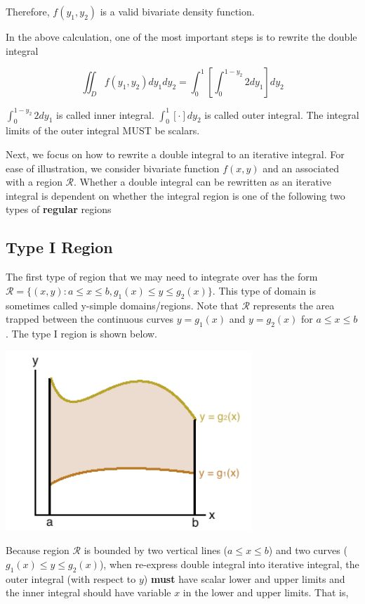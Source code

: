 \documentclass[
]{book}
\begin{document}
Therefore, \(f(y_1,y_2)\) is a valid bivariate density function.

In the above calculation, one of the most important steps is to rewrite the double integral

\[
\iint_D f(y_1,y_2)dy_1dy_2 = \int_0^1 \left[ \int_0^{1-y_2}2 dy_1 \right] dy_2
\]

\(\int_0^{1-y_2}2 dy_1\) is called inner integral. \(\int_0^1 \left[ \cdot \right] dy_2\) is called outer integral. The integral limits of the outer integral MUST be scalars.

Next, we focus on how to rewrite a double integral to an iterative integral. For ease of illustration, we consider bivariate function \(f(x,y)\) and an associated with a region \(\mathcal{R}\). Whether a double integral can be rewritten as an iterative integral is dependent on whether the integral region is one of the following two types of \textbf{regular} regions

\hypertarget{type-i-region}{%
\subsection{Type I Region}\label{type-i-region}}

The first type of region that we may need to integrate over has the form \(\mathcal{R} =\{(x,y):a \le x \le b, g_1(x) \le y \le g_2(x)\}\). This type of domain is sometimes called y-simple domains/regions. Note that \(\mathcal{R}\) represents the area trapped between the continuous curves \(y=g_1(x)\) and \(y=g_2(x)\) for \(a \le x \le b\). The type I region is shown below.

\begin{center}\includegraphics[width=0.3\linewidth]{topic06/typeOneRegion} \end{center}

Because region \(\mathcal{R}\) is bounded by two vertical lines (\(a \le x \le b\)) and two curves (\(g_1(x) \le y \le g_2(x)\)), when re-express double integral into iterative integral, the outer integral (with respect to \(y\)) \textbf{must} have scalar lower and upper limits and the inner integral should have variable \(x\) in the lower and upper limits. That is,
\end{document}
